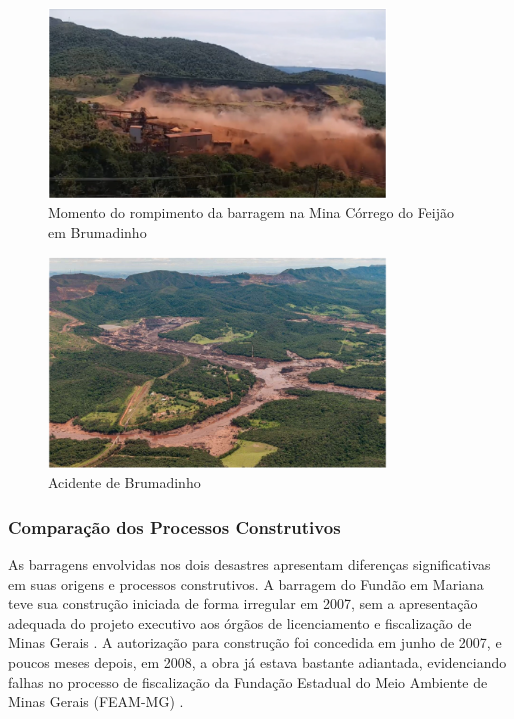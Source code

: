 \begin{figure}[htbp]
    \centering
    \includegraphics[width=0.8\textwidth]{figures/image34_momento_depois_brumadinho.png}
    \caption{Momento do rompimento da barragem na Mina Córrego do Feijão em Brumadinho}
    \label{fig:momento_depois_brumadinho}
\end{figure}

\begin{figure}[htbp]
    \centering
    \includegraphics[width=0.8\textwidth]{figures/image36_acidente_brumadinho.png}
    \caption{Acidente de Brumadinho}
    \label{fig:acidente_brumadinho}
\end{figure}

\subsubsection{Comparação dos Processos Construtivos}

As barragens envolvidas nos dois desastres apresentam diferenças significativas em suas origens e processos construtivos. A barragem do Fundão em Mariana teve sua construção iniciada de forma irregular em 2007, sem a apresentação adequada do projeto executivo aos órgãos de licenciamento e fiscalização de Minas Gerais \cite{estadominas2016irregular}. A autorização para construção foi concedida em junho de 2007, e poucos meses depois, em 2008, a obra já estava bastante adiantada, evidenciando falhas no processo de fiscalização da Fundação Estadual do Meio Ambiente de Minas Gerais (FEAM-MG) \cite{estadominas2016irregular}.

